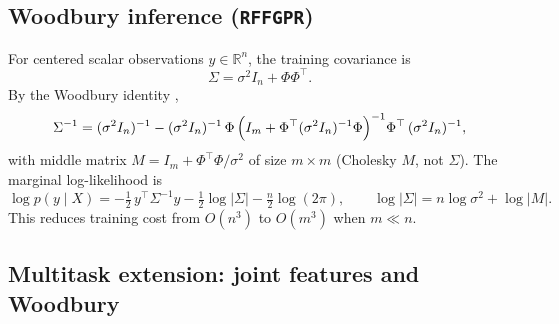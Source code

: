 \documentclass[11pt]{article}
\newcommand{\noise}{\sigma^2}
\newcommand{\Sig}{\Sigma}
\newcommand{\Ph}{\Phi}
\begin{document}

\subsection{Woodbury inference (\texttt{RFFGPR})}
\label{sec:woodbury}

For centered scalar observations $y \in \mathbb{R}^n$, the training covariance is
\begin{equation}
  \label{eq:sigma-scalar}
  \Sig = \noise I_n + \Ph\Ph^\top.
\end{equation}
By the Woodbury identity \citep{cutajar2017dgp},
\begin{equation}
  \label{eq:woodbury-scalar}
  \Sig^{-1}
  = (\noise I_n)^{-1}
  - (\noise I_n)^{-1}\,
    \Ph\,
    \Bigl(I_m + \Ph^{\top}(\noise I_n)^{-1}\Ph\Bigr)^{-1}
    \Ph^{\top}\,
    (\noise I_n)^{-1},
\end{equation}
with middle matrix $M = I_m + \Ph^{\top}\Ph/\noise$ of size $m \times m$ (Cholesky $M$, not $\Sig$).
The marginal log-likelihood is
\begin{equation}
  \label{eq:mll}
  \log p(y \mid X)
  = -\tfrac{1}{2}\,y^\top \Sig^{-1} y
  - \tfrac{1}{2}\log|\Sig|
  - \tfrac{n}{2}\log(2\pi),
  \qquad
  \log|\Sig| = n\log\noise + \log|M|.
\end{equation}
This reduces training cost from $O(n^3)$ to $O(m^3)$ when $m \ll n$.

\subsection{Multitask extension: joint features and Woodbury}
\label{sec:mt-woodbury}
\end{document}
